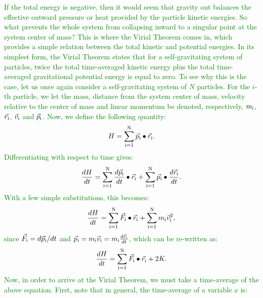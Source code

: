 \documentclass[main.tex]{subfiles}
\begin{document}
\begin{tcolorbox}[sharp corners, colback=green!30, colframe=green!80!blue, title=Virial Theorem$^{10}$]
\par \textcolor{green} {If the total energy is negative, then it would seem that gravity out balances the effective outward pressure or heat provided by the particle kinetic energies.  So what prevents the whole system from collapsing inward to a singular point at the system center of mass?  This is where the Virial Theorem comes in, which provides a simple relation between the total kinetic and potential energies.  In its simplest form, the Virial Theorem states that for a self-gravitating system of particles, twice the total time-averaged kinetic energy plus the total time-averaged gravitational potential energy is equal to zero.  To see why this is the case, let us once again consider a self-gravitating system of $N$ particles.  For the $i$-th particle, we let the mass, distance from the system center of mass, velocity relative to the center of mass and linear momentum be denoted, respectively, $m_{\rm i}$, $\vec{r}_{\rm i}$, $\vec{v}_{\rm i}$ and $\vec{p}_{\rm i}$.   Now, we define the following quantity:
\begin{equation}
H = \sum_{\rm i=1}^{\rm N} \vec{p}_{\rm i} \bullet \vec{r}_{\rm i}.
\end{equation}
Differentiating with respect to time gives:
\begin{equation}
\frac{dH}{dt} =  \sum_{\rm i=1}^{\rm N} \frac{d\vec{p}_{\rm i}}{dt} \bullet \vec{r}_{\rm i} + \sum_{\rm i=1}^{\rm N} \vec{p}_{\rm i} \bullet \frac{d\vec{r}_{\rm i}}{dt}.
\end{equation}
With a few simple substitutions, this becomes:
\begin{equation}
\frac{dH}{dt} =  \sum_{\rm i=1}^{\rm N} \vec{F}_{\rm i} \bullet \vec{r}_{\rm i} + \sum_{\rm i=1}^{\rm N} m_{\rm i}\vec{v}_{\rm i}^2,
\end{equation}
since $\vec{F}_{\rm i} = d\vec{p}_{\rm i}/dt$ and $\vec{p}_{\rm i} = m_{\rm i}\vec{v}_{\rm i} = m_{\rm i}\frac{d\vec{r}_{\rm i}}{dt}$,
which can be re-written as:
\begin{equation}
\frac{dH}{dt} =  \sum_{\rm i=1}^{\rm N} \vec{F}_{\rm i} \bullet \vec{r}_{\rm i} + 2K.
\label{eqn:dhdt}
\end{equation}
Now, in order to arrive at the Virial Theorem, we must take a time-average of the above equation.  First, note that in general, the time-average of a variable $x$ is:
}
\end{tcolorbox}
\end{document}

